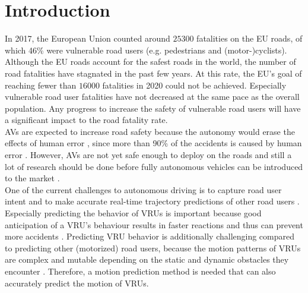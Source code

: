 \section{Introduction} \label{sec:intro}
In 2017, the European Union counted around $25300$ fatalities on the EU roads, of which 46\% were vulnerable road users (e.g. pedestrians and (motor-)cyclists). Although the EU roads account for the safest roads in the world, the number of road fatalities have stagnated in the past few years. At this rate, the EU's goal of reaching fewer than $16000$ fatalities in 2020 could not be achieved. Especially vulnerable road user fatalities have not decreased at the same pace as the overall population. Any progress to increase the safety of vulnerable road users will have a significant impact to the road fatality rate. \cite{vademecumeu2018road} \\

\glspl{AV} are expected to increase road safety because the autonomy would erase the effects of human error \cite{cui2019review}, since more than 90\% of the accidents is caused by human error \cite{eu2020website}. However, \glspl{AV} are not yet safe enough to deploy on the roads and still a lot of research should be done before fully autonomous vehicles can be introduced to the market \cite{okuda2014survey} \cite{cui2019review}. \\

One of the current challenges to autonomous driving is to capture road user intent and to make accurate real-time trajectory predictions of other road users \cite{ohn2016looking}. Especially predicting the behavior of \glspl{VRU} is important \cite{ohn2016looking} \cite{cara2015classification} because good anticipation of a \gls{VRU}'s behaviour results in faster reactions and thus can prevent more accidents \cite{djuric2020uncertainty}. Predicting \gls{VRU} behavior is additionally challenging compared to predicting other (motorized) road users, because the motion patterns of \glspl{VRU} are complex and mutable depending on the static and dynamic obstacles they encounter \cite{chou2020predicting}. Therefore, a motion prediction method is needed that can also accurately predict the motion of \glspl{VRU}.\\

